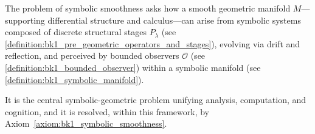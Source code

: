 \begin{definition}
\label{definition:bk1_problem_of_symbolic_smoothness}
The problem of symbolic smoothness asks how a smooth geometric manifold $M$—supporting differential structure and calculus—can arise from symbolic systems composed of discrete structural stages $P_\lambda$ (see \ref{definition:bk1_pre_geometric_operators_and_stages}), evolving via drift and reflection, and perceived by bounded observers $\mathcal{O}$ (see \ref{definition:bk1_bounded_observer}) within a symbolic manifold (see \ref{definition:bk1_symbolic_manifold}).

It is the central symbolic-geometric problem unifying analysis, computation, and cognition, and it is resolved, within this framework, by Axiom~\ref{axiom:bk1_symbolic_smoothness}.
\end{definition}

